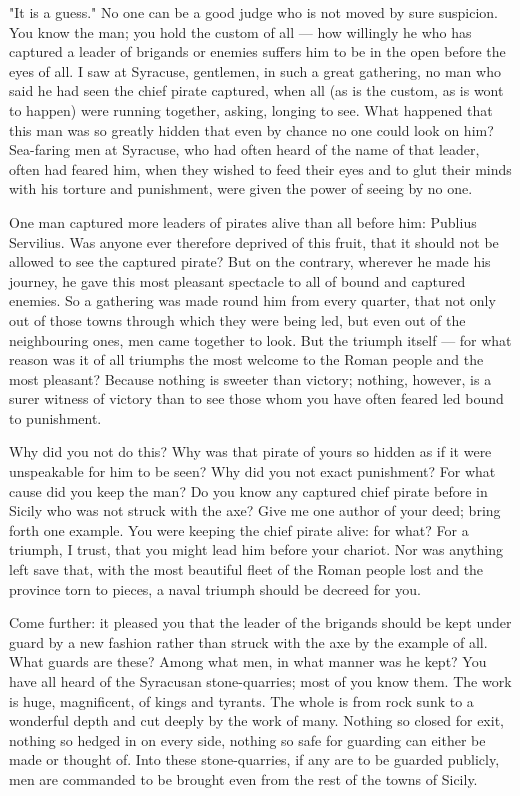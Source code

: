  "It is a guess." No one can be a good judge who is not moved by sure suspicion. You know the man; you hold the custom of all --- how willingly he who has captured a leader of brigands or enemies suffers him to be in the open before the eyes of all. I saw at Syracuse, gentlemen, in such a great gathering, no man who said he had seen the chief pirate captured, when all (as is the custom, as is wont to happen) were running together, asking, longing to see. What happened that this man was so greatly hidden that even by chance no one could look on him? Sea-faring men at Syracuse, who had often heard of the name of that leader, often had feared him, when they wished to feed their eyes and to glut their minds with his torture and punishment, were given the power of seeing by no one.

 One man captured more leaders of pirates alive than all before him: Publius Servilius. Was anyone ever therefore deprived of this fruit, that it should not be allowed to see the captured pirate? But on the contrary, wherever he made his journey, he gave this most pleasant spectacle to all of bound and captured enemies. So a gathering was made round him from every quarter, that not only out of those towns through which they were being led, but even out of the neighbouring ones, men came together to look. But the triumph itself --- for what reason was it of all triumphs the most welcome to the Roman people and the most pleasant? Because nothing is sweeter than victory; nothing, however, is a surer witness of victory than to see those whom you have often feared led bound to punishment.

 Why did you not do this? Why was that pirate of yours so hidden as if it were unspeakable for him to be seen? Why did you not exact punishment? For what cause did you keep the man? Do you know any captured chief pirate before in Sicily who was not struck with the axe? Give me one author of your deed; bring forth one example. You were keeping the chief pirate alive: for what? For a triumph, I trust, that you might lead him before your chariot. Nor was anything left save that, with the most beautiful fleet of the Roman people lost and the province torn to pieces, a naval triumph should be decreed for you.

 Come further: it pleased you that the leader of the brigands should be kept under guard by a new fashion rather than struck with the axe by the example of all. What guards are these? Among what men, in what manner was he kept? You have all heard of the Syracusan stone-quarries; most of you know them. The work is huge, magnificent, of kings and tyrants. The whole is from rock sunk to a wonderful depth and cut deeply by the work of many. Nothing so closed for exit, nothing so hedged in on every side, nothing so safe for guarding can either be made or thought of. Into these stone-quarries, if any are to be guarded publicly, men are commanded to be brought even from the rest of the towns of Sicily.

